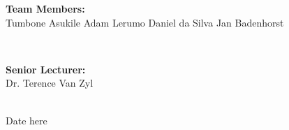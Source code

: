 \documentclass[a4paper]{article}
\begin{document}
\begin{titlepage}
\begin{minipage}{0.4\textwidth}
\begin{flushleft}
\textbf{Team Members:} \\[0.3cm]

Tumbone Asukile\newline
Adam Lerumo\newline
Daniel da Silva\newline
Jan Badenhorst\newline

\end{flushleft}

\end{minipage} \\[0.7cm]

\begin{minipage}{0.4\textwidth}

\begin{flushright} \large

\textbf{Senior Lecturer:} \\[0.3cm]

Dr. Terence Van Zyl

\end{flushright}

\end{minipage} \\[1cm]

{\large Date here} 
    
\end{titlepage}

\setlength\parindent{24pt}

\newpage
\end{document}
